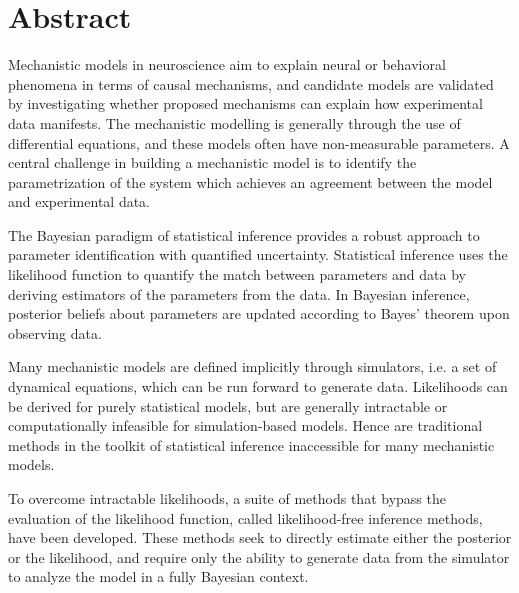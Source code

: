 \chapter*{Abstract}

Mechanistic models in neuroscience aim to explain neural or behavioral phenomena in terms of causal mechanisms, and candidate models are validated by investigating whether proposed mechanisms can explain how experimental data manifests. The mechanistic modelling is generally through the use of differential equations, and these models often have non-measurable parameters. A central challenge in building a mechanistic model is to identify the parametrization of the system which achieves an agreement between the model and experimental data.

The Bayesian paradigm of statistical inference provides a robust approach to parameter identification with quantified uncertainty. Statistical inference uses the likelihood function to quantify the match between parameters and data by deriving estimators of the parameters from the data. In Bayesian inference, posterior beliefs about parameters are updated according to Bayes' theorem upon observing data.

Many mechanistic models are defined implicitly through simulators, i.e. a set of dynamical equations, which can be run forward to generate data. Likelihoods can be derived for purely statistical models, but are generally intractable or computationally infeasible for simulation-based models. Hence are traditional methods in the toolkit of statistical inference inaccessible for many mechanistic models.

To overcome intractable likelihoods, a suite of methods that bypass the evaluation of the likelihood function, called likelihood-free inference methods, have been developed. These methods seek to directly estimate either the posterior or the likelihood, and require only the ability to generate data from the simulator to analyze the model in a fully Bayesian context.